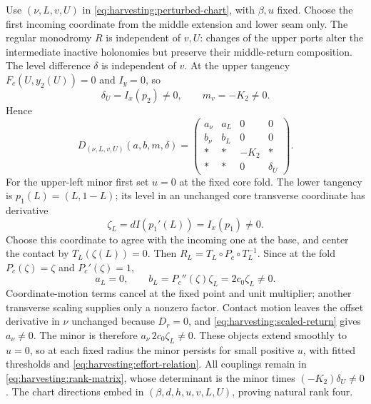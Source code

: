 Use \((\nu,L,v,U)\) in \eqref{eq:harvesting:perturbed-chart}, with
\(\beta,u\) fixed. Choose the first incoming coordinate from the
middle extension and lower seam only. The regular monodromy \(R\)
is independent of \(v,U\): changes of the upper ports alter the
intermediate inactive holonomies but preserve their middle-return
composition. The level difference \(\delta\) is independent of
\(v\). At the upper tangency \(F_c(U,y_2(U))=0\) and \(I_y=0\),
so
\begin{equation}\label{eq:harvesting:upper-rank}
 \delta_U=I_x(p_2)\ne0,\qquad m_v=-K_2\ne0.
\end{equation}
Hence
\begin{equation}\label{eq:harvesting:rank-matrix}
 D_{(\nu,L,v,U)}(a,b,m,\delta)=
 \begin{pmatrix}
 a_\nu&a_L&0&0\\ b_\nu&b_L&0&0\\
 *&*&-K_2&*\\ *&*&0&\delta_U
 \end{pmatrix}.
\end{equation}
For the upper-left minor first set \(u=0\) at the fixed core fold.
The lower tangency is \(p_1(L)=(L,1-L)\); its level in an unchanged
core transverse coordinate has derivative
\begin{equation}\label{eq:harvesting:lower-level}
 \zeta_L=dI(p_1'(L))=I_x(p_1)\ne0.
\end{equation}
Choose this coordinate to agree with the incoming one at the base,
and center the contact by \(T_L(\zeta(L))=0\). Then
\(R_L=T_L\circ P_c\circ T_L^{-1}\). Since at the fold
\(P_c(\zeta)=\zeta\) and \(P_c'(\zeta)=1\),
\begin{equation}\label{eq:harvesting:lower-rank}
 a_L=0,\qquad b_L=P_c''(\zeta)\zeta_L
                   =2c_0\zeta_L\ne0.
\end{equation}
Coordinate-motion terms cancel at the fixed point and unit multiplier;
another transverse scaling supplies only a nonzero factor. Contact
motion leaves the offset derivative in \(\nu\) unchanged because
\(D_r=0\), and \eqref{eq:harvesting:scaled-return} gives
\(a_\nu\ne0\). The minor is therefore
\(a_\nu\,2c_0\zeta_L\ne0\). These objects extend smoothly to
\(u=0\), so at each fixed radius the minor persists for small
positive \(u\), with fitted thresholds and
\eqref{eq:harvesting:effort-relation}. All couplings remain in
\eqref{eq:harvesting:rank-matrix}, whose determinant is the minor
times \((-K_2)\delta_U\ne0\). The chart directions embed in
\((\beta,d,h,u,v,L,U)\), proving natural rank four.

